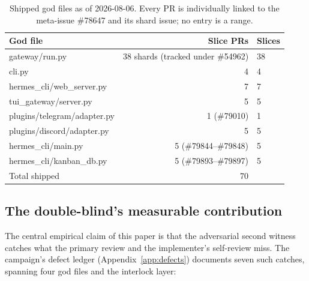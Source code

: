 \documentclass[11pt]{article}
\theoremstyle{definition}
\theoremstyle{plain}
\theoremstyle{remark}
\begin{document}
\begin{table}[H]
\centering
\caption{Shipped god files as of 2026-08-06. Every PR is individually
linked to the meta-issue \#78647 and its shard issue; no entry is a range.}
\label{tab:ships}
\begin{tabular}{lrl}
\toprule
God file & Slice PRs & Slices \\
\midrule
gateway/run.py & 38 shards (tracked under \#54962) & 38 \\
cli.py & 4 & 4 \\
hermes\_cli/web\_server.py & 7 & 7 \\
tui\_gateway/server.py & 5 & 5 \\
plugins/telegram/adapter.py & 1 (\#79010) & 1 \\
plugins/discord/adapter.py & 5 & 5 \\
hermes\_cli/main.py & 5 (\#79844--\#79848) & 5 \\
hermes\_cli/kanban\_db.py & 5 (\#79893--\#79897) & 5 \\
\midrule
Total shipped & 70 & \\
\bottomrule
\end{tabular}
\end{table}

\subsection{The double-blind's measurable contribution}

The central empirical claim of this paper is that the adversarial second
witness catches what the primary review and the implementer's self-review
miss. The campaign's defect ledger (Appendix~\ref{app:defects}) documents
seven such catches, spanning four god files and the interlock layer:
\end{document}
